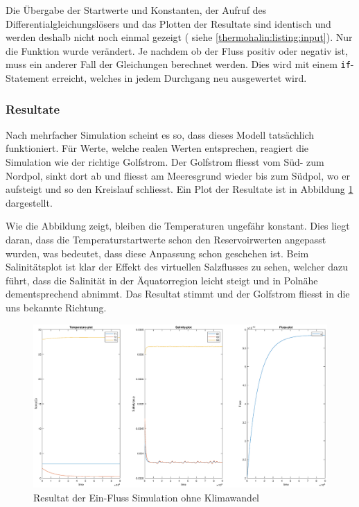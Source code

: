 Die Übergabe der Startwerte und Konstanten, der Aufruf des Differentialgleichungslösers und das Plotten der Resultate sind identisch und werden deshalb nicht noch einmal gezeigt ( siehe  \ref{thermohalin:listing:input}). Nur die Funktion wurde verändert. Je nachdem ob der Fluss positiv oder negativ ist, muss ein anderer Fall der Gleichungen berechnet werden. Dies wird mit einem \texttt{if}-Statement erreicht, welches in jedem Durchgang neu ausgewertet wird. 




\subsubsection{Resultate} 

Nach mehrfacher Simulation scheint es so, dass dieses Modell tatsächlich funktioniert. Für Werte, welche realen Werten entsprechen, reagiert die Simulation wie der richtige Golfstrom. Der Golfstrom fliesst vom Süd- zum Nordpol, sinkt dort ab und fliesst am Meeresgrund wieder bis zum Südpol, wo er aufsteigt und so den Kreislauf schliesst. Ein Plot der Resultate ist in Abbildung \ref{thermohalin:3b1f-skript} dargestellt.

Wie die Abbildung zeigt, bleiben die Temperaturen ungefähr konstant. Dies liegt daran, dass die Temperaturstartwerte schon den Reservoirwerten angepasst wurden, was bedeutet, dass diese Anpassung schon geschehen ist. Beim Salinitätsplot ist klar der Effekt des virtuellen Salzflusses zu sehen, welcher dazu führt, dass die Salinität in der Äquatorregion leicht steigt und in Polnähe dementsprechend abnimmt. Das Resultat stimmt und der Golfstrom fliesst in die uns bekannte Richtung.

\begin{figure}
	\centering
	\includegraphics[width=14cm]{thermohalin/Code/graphs/3b1f-skript.eps}
	\caption{Resultat der Ein-Fluss Simulation ohne Klimawandel}
	\label{thermohalin:3b1f-skript}
\end{figure}

